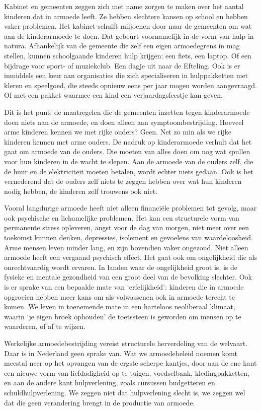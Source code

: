 Kabinet en gemeenten zeggen zich met name zorgen te maken over het
aantal kinderen dat in armoede leeft. Ze hebben slechtere kansen op
school en hebben vaker problemen. Het kabinet schuift miljoenen door
naar de gemeenten om wat aan de kinderarmoede te doen. Dat gebeurt
voornamelijk in de vorm van hulp in natura. Afhankelijk van de gemeente
die zelf een eigen armoedegrens in mag stellen, kunnen schoolgaande
kinderen hulp krijgen: een fiets, een laptop. Of een bijdrage voor
sport- of muziekclub. Een dagje uit naar de Efteling. Ook is er
inmiddels een keur aan organisaties die zich specialiseren in
hulppakketten met kleren en speelgoed, die steeds opnieuw eens per jaar
mogen worden aangevraagd. Of met een pakket waarmee een kind een
verjaardagsfeestje kan geven.

Dit is het punt: de maatregelen die de gemeenten inzetten tegen
kinderarmoede doen niets aan de armoede, en doen alleen aan
symptoombestrijding. Hoeveel arme kinderen kennen we met rijke ouders?
Geen. Net zo min als we rijke kinderen kennen met arme ouders. De nadruk
op kinderarmoede verhult dat het gaat om armoede van de ouders. Die
moeten van alles doen om nog wat spullen voor hun kinderen in de wacht
te slepen. Aan de armoede van de ouders zelf, die de huur en de
elektriciteit moeten betalen, wordt echter niets gedaan. Ook is het
vernederend dat de ouders zelf niets te zeggen hebben over wat hun
kinderen nodig hebben, de kinderen zelf trouwens ook niet.

Vooral langdurige armoede heeft niet alleen financiële problemen tot
gevolg, maar ook psychische en lichamelijke problemen. Het kan een
structurele vorm van permanente stress opleveren, angst voor de dag van
morgen, niet meer over een toekomst kunnen denken, depressies, isolement
en gevoelens van waardeloosheid. Arme mensen leven minder lang, en zijn
bovendien vaker ongezond. Niet alleen armoede heeft een vergaand
psychisch effect. Het gaat ook om ongelijkheid die als onrechtvaardig
wordt ervaren. In landen waar de ongelijkheid groot is, is de fysieke en
mentale gezondheid van een groot deel van de bevolking slechter. Ook is
er sprake van een bepaalde mate van `erfelijkheid': kinderen die in
armoede opgroeien hebben meer kans om als volwassenen ook in armoede
terecht te komen. We leven in toenemende mate in een harteloos
neoliberaal klimaat, waarin `je eigen broek ophouden' de toetssteen is
geworden om mensen op te waarderen, of af te wijzen.

Werkelijke armoedebestrijding vereist structurele herverdeling van de
welvaart. Daar is in Nederland geen sprake van. Wat we armoedebeleid
noemen komt meestal neer op het opvangen van de ergste scherpe kantjes,
door aan de ene kant een nieuwe vorm van liefdadigheid op te tuigen,
voedselbank, kledingpakketten, en aan de andere kant hulpverlening,
zoals cursussen budgetteren en schuldhulpverlening. We zeggen niet dat
hulpverlening slecht is, we zeggen wel dat die geen verandering brengt
in de productie van armoede.

